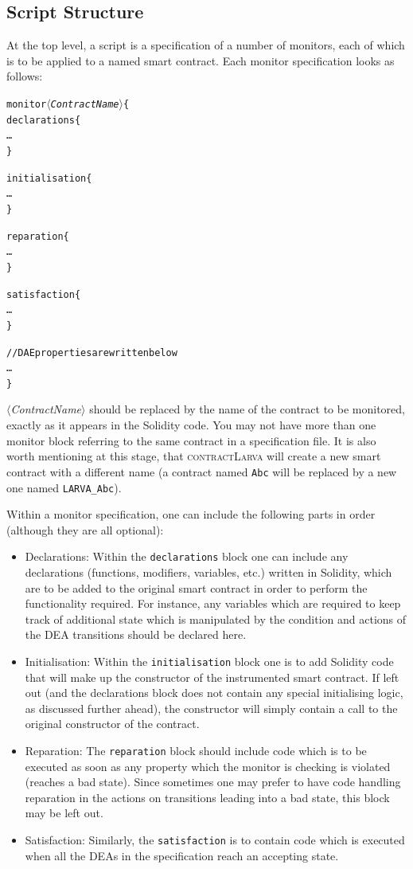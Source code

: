 \documentclass{article}
\newcommand{\contractlarva}{\textsc{contractLarva}\xspace}
\newcommand{\keyword}[1]{\textit{$\langle$#1$\rangle$}}
\begin{document}
  \subsection{Script Structure}

  At the top level, a script is a specification of a number of monitors, each of which is to be applied to a named smart contract. Each monitor specification looks as follows:

  \small\begin{alltt}
  monitor \keyword{ContractName} \{
    declarations \{
      \ldots
    \}
    
    initialisation \{
      \ldots
    \}

    reparation \{
      \ldots
    \}

    satisfaction \{
      \ldots
    \}

    // DAE properties are written below
    \ldots
  \}
  \end{alltt}\normalsize
 
  \keyword{ContractName} should be replaced by the name of the contract to be monitored, exactly as it appears in the Solidity code. You may not have more than one monitor block referring to the same contract in a specification file. It is also worth mentioning at this stage, that \contractlarva will create a new smart contract with a different name (a contract named \texttt{Abc} will be replaced by a new one named \texttt{LARVA\_Abc}).
  
  Within a monitor specification, one can include the following parts in order (although they are all optional):
  
  \begin{itemize}
    \item Declarations: Within the \texttt{declarations} block one can include any declarations (functions, modifiers, variables, etc.)  written in Solidity, which are to be added to the original smart contract in order to perform the functionality required. For instance, any variables which are required to keep track of additional state which is manipulated by the condition and actions of the DEA transitions should be declared here.
    \item Initialisation: Within the \texttt{initialisation} block one is to add Solidity code that will make up the constructor of the instrumented smart contract. If left out (and the declarations block does not contain any special initialising logic, as discussed further ahead), the constructor will simply contain a call to the original constructor of the contract.
    \item Reparation: The \texttt{reparation} block should include code which is to be executed as soon as any property which the monitor is checking is violated (reaches a bad state). Since sometimes one may prefer to have code handling reparation in the actions on transitions leading into a bad state, this block may be left out.
    \item Satisfaction: Similarly, the \texttt{satisfaction} is to contain code which is executed when all the DEAs in the specification reach an accepting state.
  \end{itemize}
\end{document}

